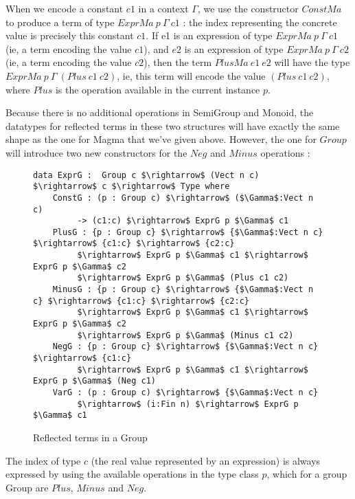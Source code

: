 When we encode a constant $c1$ in a context $\Gamma$, we use the constructor $ConstMa$ to produce a term of type $ExprMa\ p\ \Gamma\ c1$ : the index representing the concrete value is precisely this constant $c1$.
If e1 is an expression of type $ExprMa\ p\ \Gamma\ c1$ (ie, a term encoding the value $c1$), and $e2$ is an expression of type $ExprMa\ p\ \Gamma\ c2$ (ie, a term encoding the value $c2$), then the term $PlusMa\ e1\ e2$ will have the type $ExprMa\ p\ \Gamma\ (Plus\ c1\ c2)$, ie, this term will encode the value $(Plus\ c1\ c2)$, where $Plus$ is the operation available in the current instance $p$.


Because there is no additional operations in SemiGroup and Monoid, the datatypes for reflected terms in these two structures will have exactly the same shape as the one for Magma that we've given above.
However, the one for $Group$ will introduce two new constructors for the $Neg$ and $Minus$ operations :


\begin{figure}[H]
\figrule
\begin{center}
\begin{lstlisting}
data ExprG :  Group c $\rightarrow$ (Vect n c) $\rightarrow$ c $\rightarrow$ Type where
    ConstG : (p : Group c) $\rightarrow$ ($\Gamma$:Vect n c) 
         -> (c1:c) $\rightarrow$ ExprG p $\Gamma$ c1
    PlusG : {p : Group c} $\rightarrow$ {$\Gamma$:Vect n c} $\rightarrow$ {c1:c} $\rightarrow$ {c2:c} 
         $\rightarrow$ ExprG p $\Gamma$ c1 $\rightarrow$ ExprG p $\Gamma$ c2 
         $\rightarrow$ ExprG p $\Gamma$ (Plus c1 c2)
    MinusG : {p : Group c} $\rightarrow$ {$\Gamma$:Vect n c} $\rightarrow$ {c1:c} $\rightarrow$ {c2:c} 
         $\rightarrow$ ExprG p $\Gamma$ c1 $\rightarrow$ ExprG p $\Gamma$ c2 
         $\rightarrow$ ExprG p $\Gamma$ (Minus c1 c2)
    NegG : {p : Group c} $\rightarrow$ {$\Gamma$:Vect n c} $\rightarrow$ {c1:c} 
         $\rightarrow$ ExprG p $\Gamma$ c1 $\rightarrow$ ExprG p $\Gamma$ (Neg c1)
    VarG : (p : Group c) $\rightarrow$ {$\Gamma$:Vect n c} 
         $\rightarrow$ (i:Fin n) $\rightarrow$ ExprG p $\Gamma$ c1
\end{lstlisting}
\end{center}
\caption{Reflected terms in a Group}
\label{ExprG}
\figrule
\end{figure}

The index of type $c$ (the real value represented by an expression) is always expressed by using the available operations in the type class $p$, which for a group Group are $Plus$, $Minus$ and $Neg$.


